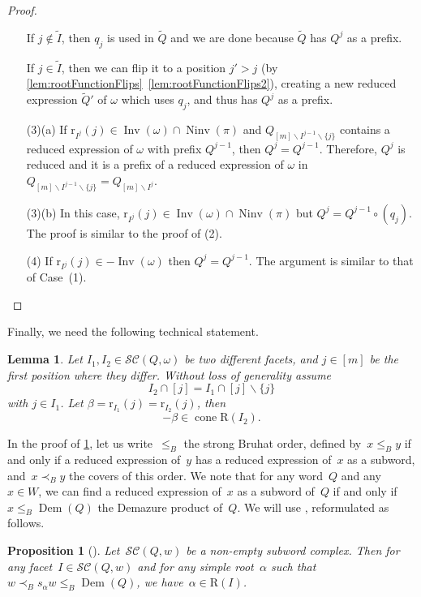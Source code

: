 \documentclass[reqno]{amsart}
\newtheorem{proposition}[theorem]{Proposition}
\newtheorem{lemma}[theorem]{Lemma}
\theoremstyle{definition}
\newcommand{\ssm}{\smallsetminus} %
\DeclareMathOperator{\cone}{cone} %
\DeclareMathOperator{\Inv}{Inv} %
\DeclareMathOperator{\Ninv}{Ninv} %
\DeclareMathOperator{\DemazureProduct}{Dem} %
\newcommand{\subwordComplex}{\mathcal{SC}} %
\newcommand{\Roots}{\mathrm{R}} %
\newcommand{\rootFunction}[2]{\mathrm{r}_{#1}(#2)} %
\begin{document}
\begin{proof}
\begin{enumerate}
    If $j\notin \widetilde I$, then $q_j$ is used in $\widetilde Q$ and we are done because $\widetilde Q$ has $Q^j$ as a prefix.

    If $j\in \widetilde I$, then we can flip it to a position $j'>j$ (by \cref{lem:rootFunctionFlips}~\eqref{lem:rootFunctionFlips2}), creating a new reduced expression $\widetilde Q'$ of $\omega$ which uses $q_j$, and thus has $Q^j$ as a prefix.


    \item[(3)(a)] If $\rootFunction{I^j}{j}\in \Inv(\omega) \cap \Ninv(\pi)$ and $Q_{[m]\ssm I^{j-1}\ssm \{j\}}$ contains a reduced expression of $\omega$ with prefix $Q^{j-1}$, then $Q^j=Q^{j-1}$.
    Therefore, $Q^j$ is reduced and it is a prefix of a reduced expression of $\omega$ in 
    $Q_{[m]\ssm I^{j-1}\ssm \{j\}}=Q_{[m]\ssm I^j}$.

    \item[(3)(b)] In this case, $\rootFunction{I^j}{j}\in \Inv(\omega) \cap \Ninv(\pi)$ but $Q^j= Q^{j-1}\circ (q_j)$. The proof is similar to the proof of (2).

    \item[(4)] If $\rootFunction{I^j}{j}\in -\Inv(\omega)$ then $Q^j=Q^{j-1}$. The argument is similar to that of Case~(1).
    \qedhere
    \end{enumerate}
\end{proof}

Finally, we need the following technical statement.

\begin{lemma}
\label{lem:sweeping3}
Let $I_1,I_2\in \subwordComplex(Q,\omega)$ be two different facets, and $j\in [m]$ be the first position where they differ.
Without loss of generality assume 
\[
I_2\cap [j] = I_1\cap [j] \ssm \{j\}
\]
with $j\in I_1$.
Let $\beta=\rootFunction{I_1}{j}=\rootFunction{I_2}{j}$, then 
\[
-\beta \in \cone \Roots(I_2).
\]
\end{lemma}

In the proof of \cref{lem:sweeping3}, let us write~$\leqslant_B$ the strong Bruhat order, defined by~$x \leqslant_B y$ if and only if a reduced expression of~$y$ has a reduced expression of~$x$ as a subword, and~$x \prec_B y$ the covers of this order. We note that for any word~$Q$ and any~$x\in W$, we can find a reduced expression of~$x$ as a subword of~$Q$ if and only if~$x \leqslant_B \DemazureProduct(Q)$ the Demazure product of~$Q$.
We will use \cite[Proposition 3.14]{JahnStump}, reformulated as follows.

\begin{proposition}[\cite{JahnStump}]\label{prop:JSDemazureCone}
Let~$\subwordComplex(Q,w)$ be a non-empty subword complex. Then for any facet~$I \in \subwordComplex(Q,w)$ and for any simple root~$\alpha$ such that~$w \prec_B s_\alpha w \leqslant_B \DemazureProduct(Q)$, we have~$\alpha \in \Roots(I)$.
\end{proposition}
\end{document}
